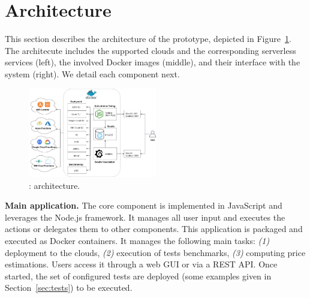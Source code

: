 \section{Architecture}\label{sec:architecture}
This section describes the architecture of the \sys prototype, depicted in Figure~\ref{fig:architecture}.
The architecute includes the supported clouds and the corresponding serverless services (left), the involved Docker images (middle), and their interface with the system (right).
We detail each component next. 

\begin{figure}[htp]
\begin{center}
\includegraphics[width=0.5\textwidth]{bilder/main_app.png}
\captionsetup{justification=centering, labelfont=bf}
\caption{\sys: architecture.}
\label{fig:architecture}
\end{center}
\end{figure}



\textbf{Main application.} The \sys core component is implemented in JavaScript and leverages the Node.js framework. 
It manages all user input and executes the actions or delegates them to other components. 
This application is packaged and executed as Docker containers. 
It manages the following main tasks: \emph{(1)} deployment to the clouds, \emph{(2)} execution of tests benchmarks, \emph{(3)} computing price estimations. 
Users access it through a web \gls{GUI} or via a REST \gls{API}. 
Once started, the set of configured tests are deployed (some examples given in Section~\ref{sec:tests}) to be executed.

